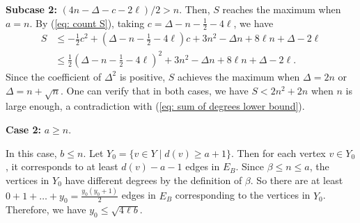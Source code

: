 \documentclass[12pt]{article}%
\begin{document}
\textbf{Subcase 2:} $(4n-\Delta -c- 2\ell)/2 > n$.
 Then, $S$ reaches the maximum when $a= n$. By (\ref{eq: count S}), taking $c = \Delta -n-\frac{1}{2}-4\ell$, we have
\begin{equation*}
\begin{aligned}
	S & \le  -\frac{1}{2}c^2+\left(\Delta -n-\frac{1}{2}-4\ell\right)c+3n^2-\Delta n+8\ell n+\Delta-2\ell\\
	&\le \frac{1}{2}\left(\Delta -n-\frac{1}{2}-4\ell\right)^2+3n^2-\Delta n+8\ell n+\Delta-2\ell.
\end{aligned}
\end{equation*}
Since the coefficient of $\Delta^2$ is positive, $S$ achieves the maximum when $\Delta=2n$ or $\Delta=n+\sqrt{n}$.
One can verify that in both cases, we have $S < 2n^2 + 2n$ when $n$ is large enough, a contradiction  with (\ref{eq: sum of degrees lower bound}).




\textbf{Case 2:} $a \ge n$.

In this case, $b\le n$.
Let $Y_0= \{ v \in Y \mid d(v) \ge a + 1\}.$
Then for each vertex $v \in Y_0$, it corresponds to at least $d(v)-a-1$ edges in $E_B$.
Since $\beta \le n \le a$, the vertices in $Y_0$ have different degrees by the definition of $\beta$.
So there are at least $0 + 1 + \ldots + y_0 = \frac{y_0(y_0+1)}{2}$ edges in $E_B$ corresponding to the vertices in $Y_0$.
Therefore, we have $y_0 \le \sqrt{4\ell b}$.
\end{document}
